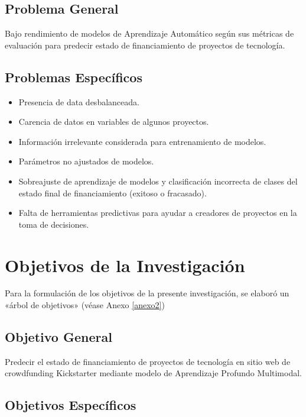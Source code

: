 \subsection{Problema General}
\newcommand{\ProblemaGeneral}{
Bajo rendimiento de modelos de Aprendizaje Automático según sus métricas de evaluación para predecir estado de financiamiento de proyectos de tecnología. 
}
\ProblemaGeneral
\subsection{Problemas Específicos}
\newcommand{\Pbone}{
Presencia de data desbalanceada.
}
\newcommand{\Pbtwo}{
Carencia de datos en variables de algunos proyectos.
}
\newcommand{\Pbthree}{
Información irrelevante considerada para entrenamiento de modelos.
}
\newcommand{\Pbfour}{
Parámetros no ajustados de modelos.
}
\newcommand{\Pbfive}{
Sobreajuste de aprendizaje de modelos y clasificación incorrecta de clases del estado final de financiamiento (exitoso o fracasado).
}
\newcommand{\Pbsix}{
Falta de herramientas predictivas para ayudar a creadores de proyectos en la toma de decisiones.
}

\begin{itemize}
	\item {\Pbone}
	\item {\Pbtwo}
	\item {\Pbthree}
	\item {\Pbfour}
	\item {\Pbfive}
	\item {\Pbsix}
\end{itemize}

\section{Objetivos de la Investigación}
Para la formulación de los objetivos de la presente investigación, se elaboró un «árbol de objetivos» (véase Anexo \ref{anexo2}) 
\subsection{Objetivo General}
\newcommand{\ObjetivoGeneral}{
Predecir el estado de financiamiento de proyectos de tecnología en sitio web de crowdfunding Kickstarter mediante modelo de Aprendizaje Profundo Multimodal.
}
\ObjetivoGeneral
\subsection{Objetivos Específicos}
\newcommand{\Objone}{
Utilizar técnicas de Machine Learning para trabajar con data desbalanceada.
}
\newcommand{\Objtwo}{
Imputar datos faltantes o incompletos de proyectos.
}
\newcommand{\Objthree}{
Definir información relevante para entrenamiento de modelos.
}
\newcommand{\Objfour}{
Ajustar parámetros de modelos.
}
\newcommand{\Objfive}{
Evitar sobreajuste de aprendizaje del modelo y clasificación incorrecta de clases del estado final de financiamiento (exitoso o fracasado).
}
\newcommand{\Objsix}{
Ofrecer herramienta analítica y predictiva a creadores de proyectos para ayudar en la toma de decisiones.
}

